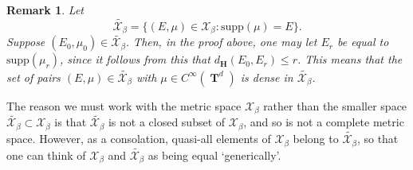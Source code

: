 \documentclass[12pt,reqno]{article}
\numberwithin{equation}{section}
\DeclareMathOperator{\TT}{\mathbf{T}}
\newtheorem{remark}[theorem]{Remark}
\numberwithin{theorem}{section}
\begin{document}
\begin{remark} \label{remarkDOIWJDIOWJ2}
    Let
    \[ \tilde{\mathcal{X}_\beta} = \{ (E,\mu) \in \mathcal{X}_\beta : \text{supp}(\mu) = E \}. \]
    Suppose $(E_0,\mu_0) \in \tilde{\mathcal{X}_\beta}$. Then, in the proof above, one may let $E_r$ be equal to $\text{supp}(\mu_r)$, since it follows from this that $d_\mathbf{H}(E_0,E_r) \leq r$. This means that the set of pairs $(E,\mu) \in \tilde{\mathcal{X}_\beta}$ with $\mu \in C^\infty(\TT^d)$ is dense in $\tilde{\mathcal{X}_\beta}$.
\end{remark}

The reason we must work with the metric space $\mathcal{X}_\beta$ rather than the smaller space $\tilde{\mathcal{X}_\beta} \subset \mathcal{X}_\beta$ is that $\tilde{\mathcal{X}_\beta}$ is not a closed subset of $\mathcal{X}_\beta$, and so is not a complete metric space. However, as a consolation, quasi-all elements of $\mathcal{X}_\beta$ belong to $\tilde{\mathcal{X}_\beta}$, so that one can think of $\mathcal{X}_\beta$ and $\tilde{\mathcal{X}_\beta}$ as being equal `generically'.
\end{document}
